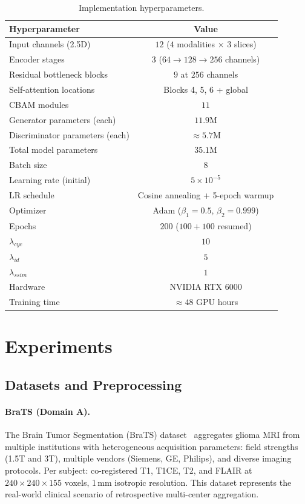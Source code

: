 \documentclass{article}
\begin{document}
\begin{table}[h]
  \centering
  \caption{Implementation hyperparameters.}
  \label{tab:impl}
  \small
  \begin{tabular}{lc}
    \toprule
    Hyperparameter & Value \\
    \midrule
    Input channels (2.5D) & $12$ ($4$ modalities $\times$ $3$ slices) \\
    Encoder stages & $3$ ($64 \to 128 \to 256$ channels) \\
    Residual bottleneck blocks & $9$ at $256$ channels \\
    Self-attention locations & Blocks 4, 5, 6 + global \\
    CBAM modules & $11$ \\
    Generator parameters (each) & $11.9\text{M}$ \\
    Discriminator parameters (each) & $\approx 5.7\text{M}$ \\
    Total model parameters & $35.1\text{M}$ \\
    Batch size & $8$ \\
    Learning rate (initial) & $5 \times 10^{-5}$ \\
    LR schedule & Cosine annealing + 5-epoch warmup \\
    Optimizer & Adam ($\beta_1{=}0.5$, $\beta_2{=}0.999$) \\
    Epochs & $200$ ($100 + 100$ resumed) \\
    $\lambda_{cyc}$ & $10$ \\
    $\lambda_{id}$ & $5$ \\
    $\lambda_{ssim}$ & $1$ \\
    Hardware & NVIDIA RTX 6000 \\
    Training time & $\approx 48$ GPU hours \\
    \bottomrule
  \end{tabular}
\end{table}

\section{Experiments}
\label{sec:experiments}

\subsection{Datasets and Preprocessing}

\paragraph{BraTS (Domain A).}
The Brain Tumor Segmentation (BraTS) dataset~\cite{menze2015brats,bakas2017advancing}
aggregates glioma MRI from multiple institutions with heterogeneous acquisition parameters:
field strengths (1.5T and 3T), multiple vendors (Siemens, GE, Philips), and diverse
imaging protocols. Per subject: co-registered T1, T1CE, T2, and FLAIR at
$240{\times}240{\times}155$ voxels, 1\,mm isotropic resolution. This dataset represents
the real-world clinical scenario of retrospective multi-center aggregation.
\end{document}
